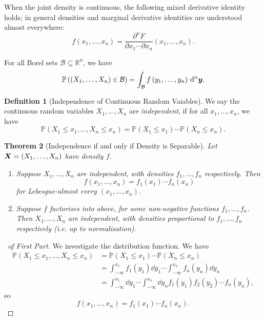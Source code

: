 \documentclass[11pt]{article}
\numberwithin{equation}{section}
\newtheorem{theorem}{Theorem}[section]
\theoremstyle{definition}
\newtheorem{definition}[theorem]{Definition}
\theoremstyle{remark}
\newcommand{\pqty}[1]{\left(#1\right)}
\newcommand{\RR}{\mathbb R}
\newcommand{\minusinfty}{-\infty}
\newcommand{\Prob}{\mathbb P}
\begin{document}
When the joint density is continuous, the following mixed derivative identity holds; in general densities and marginal derivative identities are understood almost everywhere:
\[
    f\pqty{x_1, \ldots, x_n} = \frac{\partial^n F}{\partial x_1 \cdots \partial x_n} \pqty{x_1, \ldots, x_n}.
\]

For all Borel sets \(\mathcal{B} \subseteq \RR^n\), we have
\[
    \Prob\pqty{\pqty{X_1, \ldots, X_n} \in \mathcal{B}} = \int_{\mathcal{B}} f \pqty{y_1, \ldots, y_n} \dd[n]{\vb{y}}.
\]

\begin{definition}[Independence of Continuous Random Vaiables]\label{probability-definition-052}
    \label{probability-def:independence-continuous-random-variables}%
    We say the continuous random variables \(X_1, \ldots, X_n\) are \emph{independent}, if for all \(x_1, \ldots, x_n\), we have
    \[
        \Prob\pqty{X_1 \leq x_1, \ldots, X_n \leq x_n} = \Prob\pqty{X_1 \leq x_1} \cdots \Prob\pqty{X_n \leq x_n}.
    \]
\end{definition}

\begin{theorem}[Independence if and only if Density is Separable]\label{probability-theorem-019}
    \label{probability-thm:rv-independent-density-separable}%
    Let \(\vb{X} = \pqty{X_1, \ldots, X_n}\) have density \(f\).
    \begin{enumerate}
        \item Suppose \(X_1, \ldots, X_n\) are independent, with densities \(f_1, \ldots, f_n\) respectively. Then
        \[
            f\pqty{x_1, \ldots, x_n} = f_1\pqty{x_1} \cdots f_n\pqty{x_n}
        \]
        for Lebesgue-almost every \((x_1,\ldots,x_n)\).
        \item Suppose \(f\) factorises into above, for some non-negative functions \(f_1, \ldots, f_n\). Then \(X_1, \ldots, X_n\) are independent, with densities proportional to \(f_1, \ldots, f_n\) respectively (i.e. up to normalisation).
    \end{enumerate}
\end{theorem}

\begin{proof}[\proofname\ of First Part]\label{probability-proof-068}
    We investigate the distribution function. We have
    \begin{align*}
        \Prob\pqty{X_1 \leq x_1, \ldots, X_n \leq x_n} &= \Prob\pqty{X_1 \leq x_1} \cdots \Prob\pqty{X_n \leq x_n} \\
        &= \int_{\minusinfty}^{x_1} f_1 \pqty{y_1} \dd{y_1} \cdots \int_{\minusinfty}^{x_n} f_n \pqty{y_n} \dd{y_n} \\
        &= \int_{\minusinfty}^{x_1} \dd{y_1} \cdots \int_{\minusinfty}^{x_n} \dd{y_n} f_1\pqty{y_1} f_2\pqty{y_2} \cdots f_n\pqty{y_n},
    \end{align*}
    so
    \[
        f\pqty{x_1, \ldots, x_n} = f_1\pqty{x_1} \cdots f_n\pqty{x_n}.
    \]
\end{proof}
\end{document}
